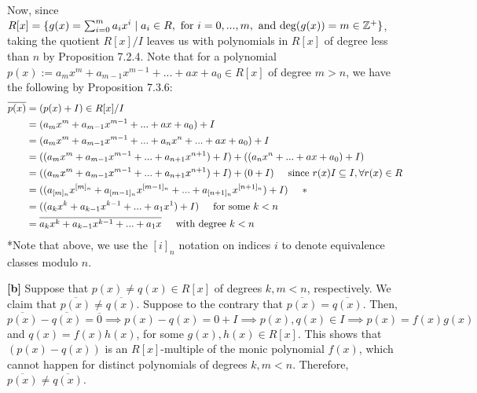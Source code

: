 Now, since $R[x] = \{ g(x) = \sum_{i=0}^ma_ix^i \mid a_i \in R, \textnormal{ for } i = 0,...,m, \textnormal{ and deg}(g(x)) = m \in \mathbb{Z}^+\}$, taking the quotient $R[x]/I$ leaves us with polynomials in $R[x]$ of degree less than $n$ by Proposition 7.2.4. Note that for a polynomial $p(x) := a_mx^m + a_{m-1}x^{m-1} + ... + ax + a_0 \in R[x]$ of degree $m > n$, we have the following by Proposition 7.3.6:
\begin{align*}
    \overline{p(x)} &= (p(x) + I) \in R[x]/I \\
    &= (a_mx^m + a_{m-1}x^{m-1} + ... + ax + a_0) + I \\
    &= (a_mx^m + a_{m-1}x^{m-1} + ... + a_nx^n + ... + ax + a_0) + I \\
    &= ((a_mx^m + a_{m-1}x^{m-1} + ... + a_{n+1}x^{n+1}) + I) +  ((a_nx^n + ... + ax + a_0) + I) \\
    &= ((a_mx^m + a_{m-1}x^{m-1} + ... + a_{n+1}x^{n+1}) + I) +  (0 + I) \hspace{5 mm} \textnormal{since } r(x)I \subseteq I, \forall r(x) \in R \\
    &= ((a_{[m]_n}x^{[m]_n} + a_{[m-1]_n}x^{[m-1]_n} + ... + a_{[n+1]_n}x^{[n+1]_n}) + I) \hspace{5 mm} *\\
    &= ((a_{k}x^{k} + a_{k-1}x^{k-1} + ... + a_1x^{1}) + I) \hspace{5 mm} \textnormal{for some } k < n \\
    &= \overline{a_{k}x^{k} + a_{k-1}x^{k-1} + ... + a_1x} \hspace{5 mm} \textnormal{with degree } k < n
\end{align*}
*Note that above, we use the $[i]_n$ notation on indices $i$ to denote equivalence classes modulo $n$. 

\vspace{3 mm}

\textbf{[b]}
Suppose that $p(x) \not= q(x) \in R[x]$ of degrees $k,m < n$, respectively. We claim that $\overline{p(x)} \not= \overline{q(x)}$. Suppose to the contrary that $\overline{p(x)} = \overline{q(x)}$. Then, $\overline{p(x)} - \overline{q(x)} = \overline{0} \implies p(x) - q(x) = 0 + I \implies p(x), q(x) \in I \implies p(x) = f(x)g(x)$ and $q(x) = f(x)h(x)$, for some $g(x),h(x) \in R[x]$. This shows that $(p(x) - q(x))$ is an $R[x]$-multiple of the monic polynomial $f(x)$, which cannot happen for distinct polynomials of degrees $k,m < n$. Therefore, $\overline{p(x)} \not= \overline{q(x)}$.

\vspace{3 mm}

